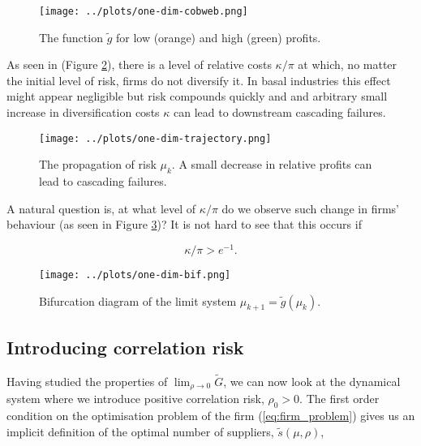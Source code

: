 \documentclass[../../main.tex]{subfiles}
\begin{document}
\begin{figure}[H]
  \centering
  \texttt{[image: ../plots/one-dim-cobweb.png]}
  \caption{The function $\tilde{g}$ for low (orange) and high (green) profits.}
  \label{fig:one-dimensional:cobweb}
\end{figure}

As seen in (Figure \ref{fig:one-dimensional:trajectory}), there is a level of relative costs $\kappa / \pi$ at which, no matter the initial level of risk, firms do not diversify it. In basal industries this effect might appear negligible but risk compounds quickly and and arbitrary small increase in diversification costs $\kappa$ can lead to downstream cascading failures. 


\begin{figure}[H]
  \centering
  \texttt{[image: ../plots/one-dim-trajectory.png]}
  \caption{The propagation of risk $\mu_k$. A small decrease in relative profits can lead to cascading failures. }
  \label{fig:one-dimensional:trajectory}
\end{figure}

A natural question is, at what level of $\kappa / \pi$ do we observe such change in firms' behaviour (as seen in Figure \ref{fig:one-dimensional-bifurcation})? It is not hard to see that this occurs if 

\begin{equation}
  \kappa / \pi > e^{-1}.
\end{equation}


\begin{figure}[H]
  \centering
  \texttt{[image: ../plots/one-dim-bif.png]}
  \caption{Bifurcation diagram of the limit system $\mu_{k + 1} = \tilde{g}(\mu_k)$.}
  \label{fig:one-dimensional-bifurcation}
\end{figure}

\subsection{Introducing correlation risk}

Having studied the properties of $\lim_{\rho \rightarrow 0 } \tilde{G}$, we can now look at the dynamical system where we introduce positive correlation risk, $\rho_0 > 0$. The first order condition on the optimisation problem of the firm (\ref{eq:firm_problem}) gives us an implicit definition of the optimal number of suppliers, $\tilde{s}(\mu, \rho)$,
\end{document}
